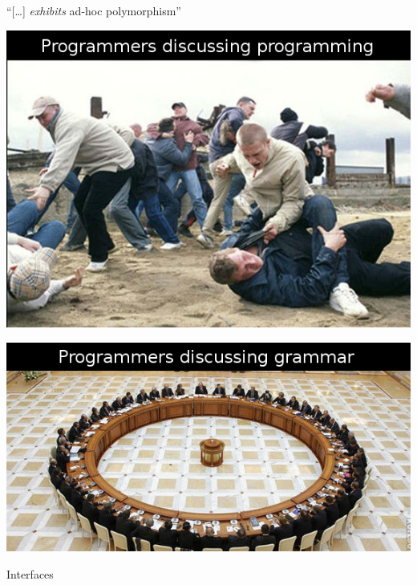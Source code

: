 \documentclass[usenames,dvipsnames,svgnames,table,aspectratio=169,mathserif]{beamer}
\begin{document}
\begin{frame}
\begin{center}
``[\ldots] {\it exhibits} ad-hoc polymorphism''
\end{center}
\end{frame}


\begin{frame}
\begin{center}
\includegraphics[scale=0.7]{programmar1.png}
\end{center}
\end{frame}


\begin{frame}
\begin{center}
\includegraphics[scale=0.8]{programmar2.png}
\end{center}
\end{frame}




\begin{frame}
\begin{center}
\huge{Interfaces}
\end{center}
\end{frame}
\end{document}
